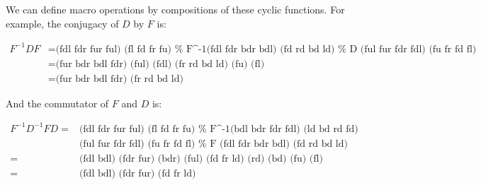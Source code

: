 We can define macro operations by compositions of these cyclic
functions.  For example, the conjugacy of $D$ by $F$ is:

\begin{align*}
  F^{-1}DF 
  &= \text{(fdl fdr fur ful) (fl fd fr fu)     %
           (fdl fdr bdr bdl) (fd rd bd ld)     %
           (ful fur fdr fdl) (fu fr fd fl)} \\ %
  &= \text{(fur bdr bdl fdr) (ful) (fdl) (fr rd bd ld) (fu) (fl)} \\
  &= \text{(fur bdr bdl fdr) (fr rd bd ld)}
\end{align*}
  
And the commutator of $F$ and $D$ is:

\begin{align*}
  F^{-1}D^{-1}FD
  = &\text{(fdl fdr fur ful) (fl fd fr fu)     %
           (bdl bdr fdr fdl) (ld bd rd fd)} \\ %
    &\text{(ful fur fdr fdl) (fu fr fd fl)     %
           (fdl fdr bdr bdl) (fd rd bd ld)} \\ %
  = &\text{(fdl bdl) (fdr fur) (bdr) (ful) (fd fr ld) (rd) (bd) (fu) (fl)} \\
  = &\text{(fdl bdl) (fdr fur) (fd fr ld)}
\end{align*}
  
